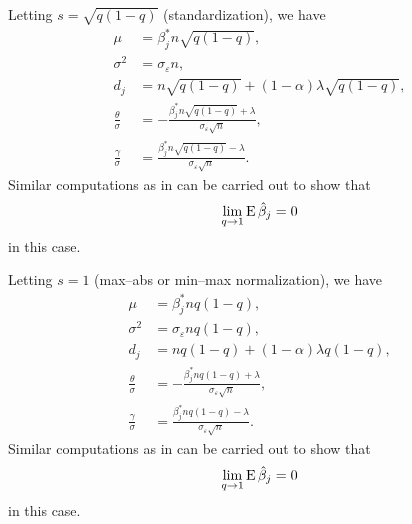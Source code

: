 \begin{corollary}
  Letting \(s = \sqrt{q(1-q)}\) (standardization), we have
  \[
    \begin{aligned}
      \mu                   & = \beta_j^* n \sqrt{q(1-q)},                                                \\
      \sigma^2              & = \sigma_\varepsilon n,                                                     \\
      d_j                   & = n\sqrt{q(1-q)} + (1 - \alpha) \lambda\sqrt{q(1-q)},                       \\
      \frac{\theta}{\sigma} & = -\frac{\beta_j^* n \sqrt{q(1-q)} + \lambda}{\sigma_\varepsilon \sqrt{n}}, \\
      \frac{\gamma}{\sigma} & =\frac{\beta_j^* n \sqrt{q(1-q)} - \lambda}{\sigma_\varepsilon \sqrt{n}}.
    \end{aligned}
  \]
  Similar computations as in  can be carried out to show that
  \[
    \lim_{q \rightarrow 1} \operatorname{E} \hat{\beta}_j = 0
  \]
  in this case.
\end{corollary}

\begin{corollary}
  Letting \(s = 1\) (max--abs or min--max normalization), we have
  \[
    \begin{aligned}
      \mu                   & = \beta_j^* n q(1-q),                                                \\
      \sigma^2              & = \sigma_\varepsilon n q(1-q),                                       \\
      d_j                   & = n q(1-q) + (1 - \alpha) \lambda q(1-q),                            \\
      \frac{\theta}{\sigma} & = -\frac{\beta_j^* n q(1-q) + \lambda}{\sigma_\varepsilon \sqrt{n}}, \\
      \frac{\gamma}{\sigma} & =\frac{\beta_j^* n q(1-q) - \lambda}{\sigma_\varepsilon \sqrt{n}}.
    \end{aligned}
  \]
  Similar computations as in  can be carried out to show that
  \[
    \lim_{q \rightarrow 1} \operatorname{E} \hat{\beta}_j = 0
  \]
  in this case.
\end{corollary}




